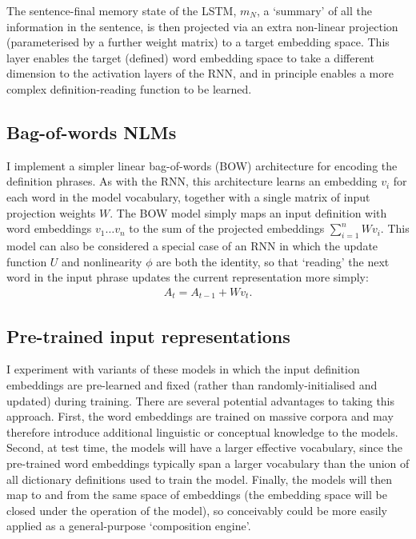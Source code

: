 The sentence-final memory state of the LSTM, \(m_N\), a `summary' of all the
information in the sentence, is then projected via an extra non-linear
projection (parameterised by a further weight matrix) to a target embedding
space. This  layer enables the target (defined) word embedding space to take a
different dimension to the activation layers of the RNN, and in principle
enables a more complex definition-reading function to be learned. 

\subsection{Bag-of-words NLMs}

I implement a simpler linear bag-of-words (BOW) architecture for encoding the
definition phrases. As with the RNN, this architecture learns an embedding
\(v_i\) for each word in the model vocabulary, together with a single matrix of
input projection weights \(W\). The BOW model simply maps an input definition
with word embeddings \(v_1 \dots v_n\) to the sum of the projected embeddings
\(\sum_{i=1}^n Wv_i \). This model can also be considered a special case of an
RNN in which the update function \(U\) and nonlinearity \(\phi\) are both the
identity, so that `reading' the next word in the input phrase updates the
current representation more simply:
\begin{align*}
A_t =  A_{t-1} + Wv_t.
\end{align*}

\subsection{Pre-trained input representations}

I experiment with variants of these models in which the input definition embeddings are pre-learned and fixed (rather than randomly-initialised and updated) during training. There are several potential advantages to taking this approach. First, the word embeddings are trained on massive corpora and may therefore introduce additional linguistic or conceptual knowledge to the models. Second, at test time, the models will have a larger effective vocabulary, since the pre-trained word embeddings typically span a larger vocabulary than the union of all dictionary definitions used to train the model. Finally, the models will then map to and from the same space of embeddings (the embedding space will be closed under the operation of the model), so conceivably could be more easily applied as a general-purpose `composition engine'.

